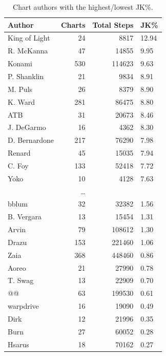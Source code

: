 \documentclass[10pt]{sigplanconf}
\begin{document}
\begin{table}[t]
	\begin{center}
		\small
	\begin{tabular}{l|r|r|l}
		\bf Author & \bf Charts & \bf Total Steps & \bf JK\% \\
		\hline
		King of Light &  24 &   8817 & 12.94 \\
		R. McKanna    &  47 &  14855 & 9.95 \\
		Konami        & 530 & 114623 & 9.63 \\
		P. Shanklin   &  21 &   9834 & 8.91 \\
		M. Puls       &  26 &   8379 & 8.90 \\
		K. Ward       & 281 &  86475 & 8.80 \\
		ATB           &  31 &  20673 & 8.46 \\
		J. DeGarmo    &  16 &   4362 & 8.30 \\
		D. Bernardone & 217 &  76290 & 7.98 \\
		Renard        &  45 &  15035 & 7.94 \\
		C. Foy        & 133 &  52418 & 7.72 \\
		Yoko          &  10 &   4128 & 7.63 \\
		\multicolumn{4}{c}{\normalsize\dots} \\
		bblum         &  32 &  32382 & 1.56 \\
		B. Vergara    &  13 &  15454 & 1.31 \\
		Arvin         &  79 & 108612 & 1.30 \\
		Drazu         & 153 & 221460 & 1.06 \\
		Zaia          & 368 & 448460 & 0.86 \\
		Aoreo         &  21 &  27990 & 0.78 \\
		T. Swag       &  13 &  22909 & 0.70 \\
		@@            &  63 & 199530 & 0.61 \\
		warpdrive     &  16 &  19090 & 0.49 \\
		Dirk          &  12 &  21996 & 0.35 \\
		Burn          &  27 &  60052 & 0.28 \\
		Hsarus        &  18 &  70162 & 0.27 \\
	\end{tabular}
	\end{center}
	\caption{Chart authors with the highest/lowest JK\%.}
\end{table}
\end{document}
